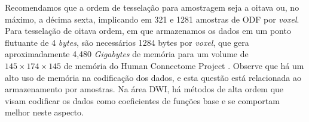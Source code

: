 \documentclass[
    12pt,                %
    oneside,            %
    a4paper,            %
    english,            %
    french,                %
    spanish,            %
    brazil                %
    ]{abntex2}
\begin{document}
\todo{\textcolor{green}{Direções amostradas com base em subdivisões de um icosaedro.}}




Recomendamos que a ordem de tesselação para amostragem seja a oitava ou, no máximo, a décima sexta, implicando em 321 e 1281 amostras de ODF por \textit{voxel}. Para tesselação de oitava ordem, em que armazenamos os dados em um ponto flutuante de 4 \textit{bytes}, são necessários 1284 bytes por \textit{voxel}, que gera aproximadamente 4,480 \textit{Gigabytes} de memória para um volume de $145 \times 174 \times 145$ de memória do Human Connectome Project \cite{essen2012}. Observe que há um alto uso de memória na codificação dos dados, e esta questão está relacionada ao armazenamento por amostras. Na área DWI, há métodos de alta ordem que visam codificar os dados como coeficientes de funções base \cite{descoteaux2007_QBI, tournier2007} e se comportam melhor neste aspecto.







\end{document}
